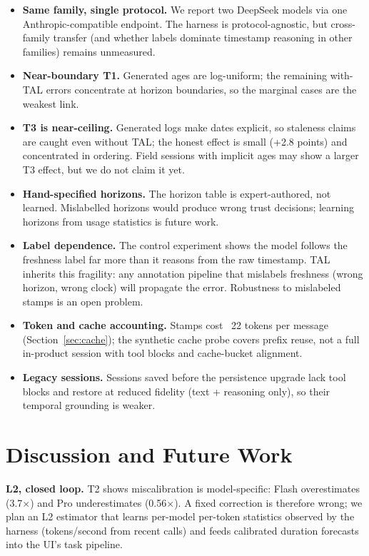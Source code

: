 \documentclass[10pt]{article}
\begin{document}
\begin{itemize}[leftmargin=1.4em,itemsep=1pt]
  \item \textbf{Same family, single protocol.} We report two DeepSeek models via one
        Anthropic-compatible endpoint. The harness is protocol-agnostic, but
        cross-family transfer (and whether labels dominate timestamp reasoning in
        other families) remains unmeasured.
  \item \textbf{Near-boundary T1.} Generated ages are log-uniform; the remaining
        with-TAL errors concentrate at horizon boundaries, so the marginal cases
        are the weakest link.
  \item \textbf{T3 is near-ceiling.} Generated logs make dates explicit, so
        staleness claims are caught even without TAL; the honest effect is small
        (+2.8 points) and concentrated in ordering. Field sessions with implicit
        ages may show a larger T3 effect, but we do not claim it yet.
  \item \textbf{Hand-specified horizons.} The horizon table is expert-authored, not
        learned. Mislabelled horizons would produce wrong trust decisions; learning
        horizons from usage statistics is future work.
  \item \textbf{Label dependence.} The control experiment shows the model follows
        the freshness label far more than it reasons from the raw timestamp. TAL
        inherits this fragility: any annotation pipeline that mislabels freshness
        (wrong horizon, wrong clock) will propagate the error. Robustness to
        mislabeled stamps is an open problem.
  \item \textbf{Token and cache accounting.} Stamps cost ~22 tokens per message
        (Section~\ref{sec:cache}); the synthetic cache probe covers prefix reuse,
        not a full in-product session with tool blocks and cache-bucket alignment.
  \item \textbf{Legacy sessions.} Sessions saved before the persistence upgrade lack
        tool blocks and restore at reduced fidelity (text + reasoning only), so their
        temporal grounding is weaker.
\end{itemize}

\section{Discussion and Future Work}
\label{sec:future}

\textbf{L2, closed loop.} T2 shows miscalibration is model-specific: Flash
overestimates (3.7$\times$) and Pro underestimates (0.56$\times$). A fixed
correction is therefore wrong; we plan an L2 estimator that learns per-model
per-token statistics observed by the harness (tokens/second from recent calls) and
feeds calibrated duration forecasts into the UI's task pipeline.
\end{document}
